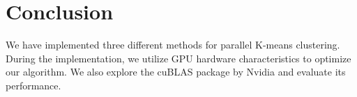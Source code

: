 \section{Conclusion}
We have implemented three different methods for parallel K-means clustering. During the
implementation, we utilize GPU hardware characteristics to optimize our algorithm. We also
explore the cuBLAS package by Nvidia and evaluate its performance.  

